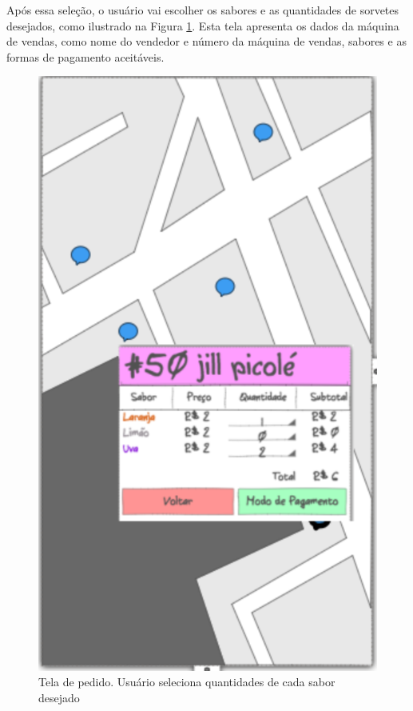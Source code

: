 Após essa seleção, o usuário vai escolher os sabores e as quantidades de sorvetes desejados, como ilustrado na Figura \ref{fig:pedido}. Esta tela apresenta os dados da máquina de vendas, como nome do vendedor e número da máquina de vendas, sabores e as formas de pagamento aceitáveis.

\begin{figure}[h]
	\centering
    \includegraphics[scale=0.7]{figuras/pedido}
	\caption{Tela de pedido. Usuário seleciona quantidades de cada sabor desejado}
    \label{fig:pedido}
\end{figure}

